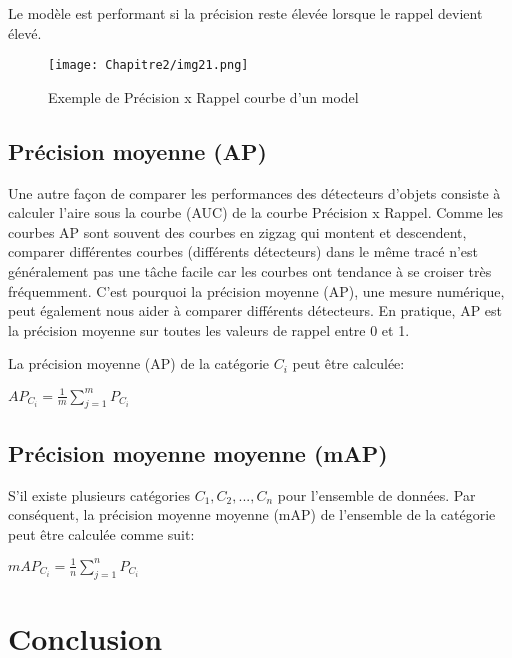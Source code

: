           Le modèle est performant si la précision reste élevée lorsque le rappel devient élevé.
          \begin{figure}[H]
               \centering
               \texttt{[image: Chapitre2/img21.png]}
               \caption{Exemple de Précision x Rappel courbe d'un model}
               \label{img21}
               \end{figure}
          
          \subsection{Précision moyenne (AP)}
          Une autre façon de comparer les performances des détecteurs d'objets consiste à calculer l'aire sous la courbe (AUC) de la courbe Précision x Rappel. Comme les courbes AP sont souvent des courbes en zigzag qui montent et descendent, comparer différentes courbes (différents détecteurs) dans le même tracé n'est généralement pas une tâche facile car les courbes ont tendance à se croiser très fréquemment. C'est pourquoi la précision moyenne (AP), une mesure numérique, peut également nous aider à comparer différents détecteurs. En pratique, AP est la précision moyenne sur toutes les valeurs de rappel entre 0 et 1.
          
          La précision moyenne (AP) de la catégorie $C_i$ peut être calculée:
          \begin{center} $AP_{C_i} = \frac{1}{m} \sum^{m}_{j=1} P_{C_i}$ \end{center}

          \subsection{Précision moyenne moyenne  (mAP)}
          S'il existe plusieurs catégories ${C_1, C_2, ... , C_n}$ pour l'ensemble de données. Par conséquent, la précision moyenne moyenne (mAP) de l'ensemble de la catégorie peut être calculée comme suit:
          \begin{center} $mAP_{C_i} = \frac{1}{n} \sum^{n}_{j=1} P_{C_i}$ \end{center}





\section{Conclusion} 
